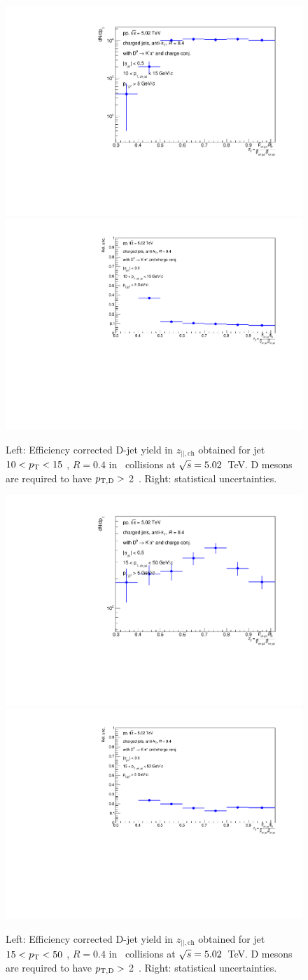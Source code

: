 \begin{figure}[bth]
\centering
\includegraphics[width=0.45\linewidth]{pp_2sig/R4_jetbin_10_15/jetPtSpectrum_SB_RebinProb_pTD5}
\includegraphics[width=0.45\linewidth]{pp_2sig/R4_jetbin_10_15/jetPtSpectrumUnc_SB_Rebin_pTD5}
\caption{Left: Efficiency corrected D-jet yield in $z_{||,\text{ch}}$ obtained for jet $10<p_{\text T}<15$ \GeVc, $R=0.4$ in \pp\ collisions at $\sqrt{s}=5.02$~TeV. D mesons are required to have $p_{\mathrm{T,D}}>$ 2~\GeVc. Right: statistical uncertainties.}
\label{fig:eq_pp_effCorr10_15_R4}
\end{figure}

\begin{figure}[bth]
\centering
\includegraphics[width=0.45\linewidth]{pp_2sig/R4_jetbin_15_50/jetPtSpectrum_SB_RebinProb_pTD5}
\includegraphics[width=0.45\linewidth]{pp_2sig/R4_jetbin_15_50/jetPtSpectrumUnc_SB_Rebin_pTD5}
\caption{Left: Efficiency corrected D-jet yield in $z_{||,\text{ch}}$ obtained for jet $15<p_{\text T}<50$ \GeVc, $R=0.4$ in \pp\ collisions at $\sqrt{s}=5.02$~TeV. D mesons are required to have $p_{\mathrm{T,D}}>$ 2~\GeVc. Right: statistical uncertainties.}
\label{fig:eq_pp_effCorr15_50_R4}
\end{figure}

